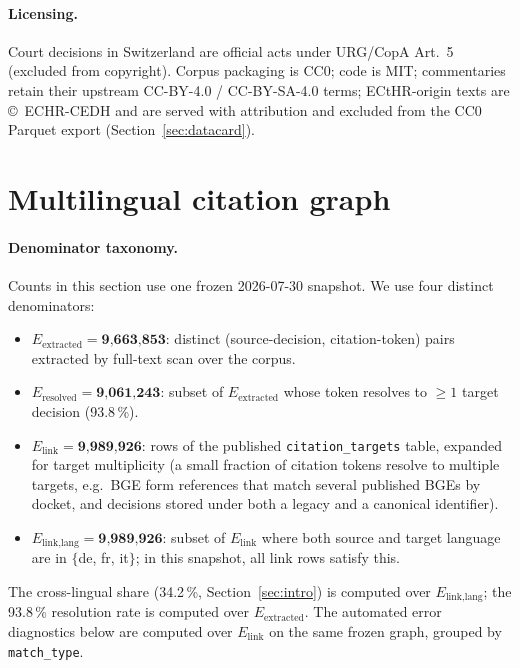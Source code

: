 \documentclass[11pt,a4paper]{article}
\begin{document}
\paragraph{Licensing.} Court decisions in Switzerland are official acts under URG/CopA Art.~5 (excluded from copyright). Corpus packaging is CC0; code is MIT; commentaries retain their upstream CC-BY-4.0 / CC-BY-SA-4.0 terms; ECtHR-origin texts are \copyright~ECHR-CEDH and are served with attribution and excluded from the CC0 Parquet export (Section~\ref{sec:datacard}).

\section{Multilingual citation graph}\label{sec:graph}

\paragraph{Denominator taxonomy.} Counts in this section use one frozen 2026-07-30 snapshot. We use four distinct denominators:
\begin{itemize}\setlength{\itemsep}{2pt}\setlength{\parskip}{0pt}
\item $E_{\textrm{extracted}} = \textbf{9{,}663{,}853}$: distinct (source-decision, citation-token) pairs extracted by full-text scan over the corpus.
\item $E_{\textrm{resolved}} = \textbf{9{,}061{,}243}$: subset of $E_{\textrm{extracted}}$ whose token resolves to $\geq 1$ target decision (93.8\,\%).
\item $E_{\textrm{link}} = \textbf{9{,}989{,}926}$: rows of the published \texttt{citation\_targets} table, expanded for target multiplicity (a small fraction of citation tokens resolve to multiple targets, e.g.\ BGE form references that match several published BGEs by docket, and decisions stored under both a legacy and a canonical identifier).
\item $E_{\textrm{link,lang}} = \textbf{9{,}989{,}926}$: subset of $E_{\textrm{link}}$ where both source and target language are in $\{$de, fr, it$\}$; in this snapshot, all link rows satisfy this.
\end{itemize}
The cross-lingual share (34.2\,\%, Section~\ref{sec:intro}) is computed over $E_{\textrm{link,lang}}$; the 93.8\,\% resolution rate is computed over $E_{\textrm{extracted}}$. The automated error diagnostics below are computed over $E_{\textrm{link}}$ on the same frozen graph, grouped by \texttt{match\_type}.
\end{document}
